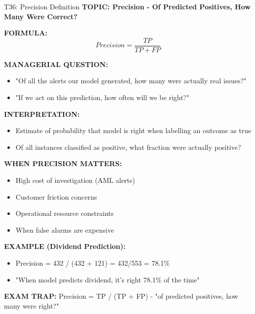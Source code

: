 \documentclass[8pt]{beamer}
\begin{document}
	\begin{frame}{T36: Precision Definition}
		\fontsize{6.5}{7.5}\selectfont
		\textbf{TOPIC: Precision - Of Predicted Positives, How Many Were Correct?}
		
		\vspace{0.1cm}
		\textbf{FORMULA:}
		\[
		Precision = \frac{TP}{TP + FP}
		\]
		
		\vspace{0.1cm}
		\textbf{MANAGERIAL QUESTION:}
		\begin{itemize}
			\item "Of all the alerts our model generated, how many were actually real issues?"
			\item "If we act on this prediction, how often will we be right?"
		\end{itemize}
		
		\vspace{0.1cm}
		\textbf{INTERPRETATION:}
		\begin{itemize}
			\item Estimate of probability that model is right when labelling an outcome as true
			\item Of all instances classified as positive, what fraction were actually positive?
		\end{itemize}
		
		\vspace{0.1cm}
		\textbf{WHEN PRECISION MATTERS:}
		\begin{itemize}
			\item High cost of investigation (AML alerts)
			\item Customer friction concerns
			\item Operational resource constraints
			\item When false alarms are expensive
		\end{itemize}
		
		\vspace{0.1cm}
		\textbf{EXAMPLE (Dividend Prediction):}
		\begin{itemize}
			\item Precision = 432 / (432 + 121) = 432/553 = 78.1\%
			\item "When model predicts dividend, it's right 78.1\% of the time"
		\end{itemize}
		
		\textcolor{myred}{\textbf{EXAM TRAP:}} Precision = \textcolor{myblue}{TP / (TP + FP)} - "of predicted positives, how many were right?"
	\end{frame}
	
\end{document}
